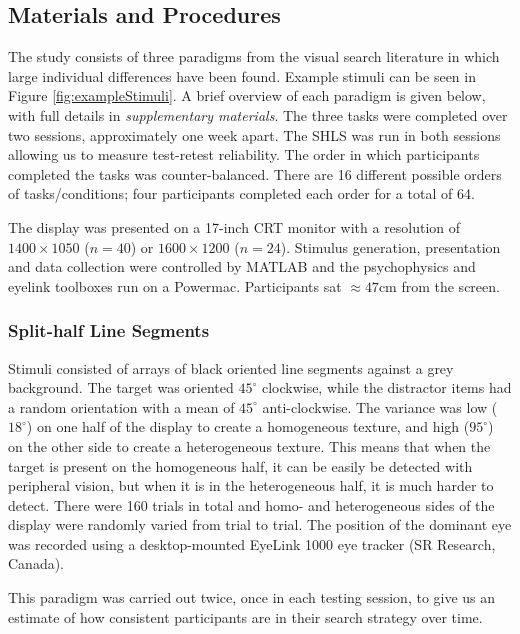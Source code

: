 \documentclass[twocolumn]{article}
\begin{document}
\subsection{Materials and Procedures}

The study consists of three paradigms from the visual search literature in which large individual differences have been  found\cite{nowakowska2017, irons-leber2016, kristjansson2014}. Example stimuli can be seen in Figure \ref{fig:exampleStimuli}. A brief overview of each paradigm is given below, with full details in \textit{supplementary materials}. The three tasks were completed over two sessions, approximately one week apart. The SHLS was run in both sessions allowing us to measure test-retest reliability. The order in which participants completed the tasks was counter-balanced. There are 16 different possible orders of tasks/conditions; four participants completed each order for a total of 64.

The display was presented on a 17-inch CRT monitor with a resolution of $1400 \times 1050$ ($n = 40$) or $1600 \times 1200$ ($n = 24$). Stimulus generation, presentation and data collection were controlled by MATLAB and the psychophysics and eyelink toolboxes \cite{brainard1997,cornelissen2002} run on a Powermac. Participants sat $\approx 47$cm from the screen.

\subsubsection{Split-half Line Segments}

Stimuli consisted of arrays of black oriented line segments against a grey background. The target was oriented $45^{\circ}$ clockwise, while the distractor items had a random orientation with a mean of $45^{\circ}$ anti-clockwise. The variance was low ($18^{\circ}$) on one half of the display to create a homogeneous texture, and high ($95^{\circ}$) on the other side to create a heterogeneous texture. This means that when the target is present on the homogeneous half, it can be easily be detected with peripheral vision, but when it is in the heterogeneous half, it is much harder to detect. There were 160 trials in total and homo- and heterogeneous sides of the display were randomly varied from trial to trial. The position of the dominant eye was recorded using a desktop-mounted EyeLink 1000 eye tracker (SR Research, Canada). 

This paradigm was carried out twice, once in each testing session, to give us an estimate of how consistent participants are in their search strategy over time. 
\end{document}
